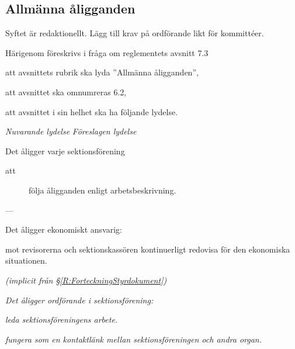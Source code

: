 \documentclass{article}
\newenvironment{lydelse}
    {\begin{paracol}{2}%
        \emph{Nuvarande lydelse}%
        \switchcolumn%
        \emph{Föreslagen lydelse}%
    \end{paracol}%
    \begin{enumerate}[label=\thesubsection.\arabic*]%
    \begin{paracol}{2}%
    }{\end{paracol}\end{enumerate}}
\begin{document}
\subsection{Allmänna åligganden}
Syftet är redaktionellt.
Lägg till krav på ordförande likt för kommittéer.

Härigenom föreskrivs i fråga om reglementets avsnitt 7.3

\begin{dels}
    \item att avsnittets rubrik ska lyda ''Allmänna åligganden'',
    \item att avsnittet ska omnumreras 6.2,
    \item att avsnittet i sin helhet ska ha följande lydelse.
\end{dels}

\begin{lydelse}
    
    \setcounter{section}{7}
    \setcounter{subsection}{3}
    
    \item Det åligger varje sektionsförening
	\begin{description}
		\item[att] följa åligganden enligt arbetsbeskrivning.
	\end{description}

    \item[] ---
    
    \vspace{5em}
    \item Det åligger ekonomiskt ansvarig:
	\begin{description}
	    \vspace{1.5em}
		\item[att] mot revisorerna och sektionskassören kontinuerligt redovisa för den ekonomiska situationen.
	\end{description}
    
    \setcounter{section}{6}
    \setcounter{subsection}{2}
    
    \switchcolumn
    
    \item[]
    \item[] \emph{(implicit från \S \ref{R:ForteckningStyrdokument})}
    
  
    \item \emph{Det åligger ordförande i sektionsförening:}
    \label{R:SektForeningOrdf}
    \begin{aligganden}
        \item \emph{leda sektionsföreningens arbete.}
        \item \emph{fungera som en kontaktlänk mellan sektionsföreningen och andra organ.}
    \end{aligganden}
    

\end{lydelse}
\end{document}
